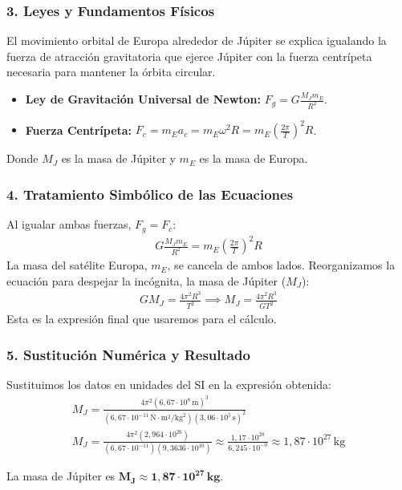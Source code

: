 \subsubsection*{3. Leyes y Fundamentos Físicos}
El movimiento orbital de Europa alrededor de Júpiter se explica igualando la fuerza de atracción gravitatoria que ejerce Júpiter con la fuerza centrípeta necesaria para mantener la órbita circular.
\begin{itemize}
    \item \textbf{Ley de Gravitación Universal de Newton:} $F_g = G \frac{M_J m_E}{R^2}$.
    \item \textbf{Fuerza Centrípeta:} $F_c = m_E a_c = m_E \omega^2 R = m_E \left(\frac{2\pi}{T}\right)^2 R$.
\end{itemize}
Donde $M_J$ es la masa de Júpiter y $m_E$ es la masa de Europa.

\subsubsection*{4. Tratamiento Simbólico de las Ecuaciones}
Al igualar ambas fuerzas, $F_g = F_c$:
\begin{gather}
    G \frac{M_J m_E}{R^2} = m_E \left(\frac{2\pi}{T}\right)^2 R
\end{gather}
La masa del satélite Europa, $m_E$, se cancela de ambos lados. Reorganizamos la ecuación para despejar la incógnita, la masa de Júpiter ($M_J$):
\begin{gather}
    G M_J = \frac{4\pi^2 R^3}{T^2} \implies M_J = \frac{4\pi^2 R^3}{G T^2}
\end{gather}
Esta es la expresión final que usaremos para el cálculo.

\subsubsection*{5. Sustitución Numérica y Resultado}
Sustituimos los datos en unidades del SI en la expresión obtenida:
\begin{gather}
    M_J = \frac{4\pi^2 (6,67 \cdot 10^8 \, \text{m})^3}{(6,67 \cdot 10^{-11} \, \text{N}\cdot\text{m}^2/\text{kg}^2) (3,06 \cdot 10^5 \, \text{s})^2} \nonumber \\
    M_J = \frac{4\pi^2 (2,964 \cdot 10^{26})}{(6,67 \cdot 10^{-11})(9,3636 \cdot 10^{10})} \approx \frac{1,17 \cdot 10^{28}}{6,245 \cdot 10^{-0}} \approx 1,87 \cdot 10^{27} \, \text{kg}
\end{gather}
\begin{cajaresultado}
    La masa de Júpiter es $\boldsymbol{M_J \approx 1,87 \cdot 10^{27} \, \textbf{kg}}$.
\end{cajaresultado}

